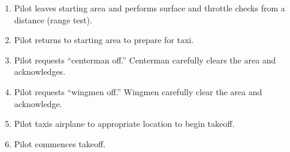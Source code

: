 \documentclass[10pt]{report}
\begin{document}
\begin{enumerate}
	\item Pilot leaves starting area and performs surface and throttle checks from a distance (range test).
	\item Pilot returns to starting area to prepare for taxi.
	\item Pilot requests ``centerman off.''  Centerman carefully clears the area and acknowledges.
	\item Pilot requests ``wingmen off.''  Wingmen carefully clear the area and acknowledge.
	\item Pilot taxis airplane to appropriate location to begin takeoff.
	\item Pilot commences takeoff.

\end{enumerate}



\end{document}
